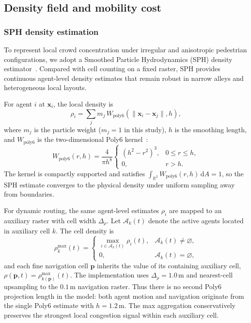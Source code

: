 \documentclass[preprint,12pt]{elsarticle}
\providecommand{\FloatBarrier}{}
\let\origsubsection\subsection
\renewcommand{\subsection}{\FloatBarrier\origsubsection}
\let\origsubsubsection\subsubsection
\renewcommand{\subsubsection}{\FloatBarrier\origsubsubsection}
\begin{document}
\subsection{Density field and mobility cost}
\label{sec:density}

\subsubsection{SPH density estimation}
\label{sec:density_estimation}

To represent local crowd concentration under irregular and anisotropic
pedestrian configurations, we adopt a Smoothed Particle Hydrodynamics
(SPH) density estimator~\citep{Monaghan1992SPH,muller2003particle}.
Compared with cell counting on a fixed raster, SPH provides continuous
agent-level density estimates that remain robust in narrow alleys and
heterogeneous local layouts.

For agent $i$ at $\mathbf{x}_i$, the local density is
\begin{equation}
\rho_i = \sum_{j} m_j \, W_{\mathrm{poly6}}(\|\mathbf{x}_i-\mathbf{x}_j\|, h),
\label{eq:sph_density_agent}
\end{equation}
where $m_j$ is the particle weight ($m_j = 1$ in this study), $h$ is the
smoothing length, and $W_{\mathrm{poly6}}$ is the two-dimensional Poly6
kernel~\citep{muller2003particle}:
\begin{equation}
W_{\mathrm{poly6}}(r, h) = \frac{4}{\pi h^8}
\begin{cases}
(h^2-r^2)^3, & 0 \le r \le h,\\
0, & r > h.
\end{cases}
\label{eq:poly6_kernel}
\end{equation}
The kernel is compactly supported and satisfies
$\int_{\mathbb{R}^2} W_{\mathrm{poly6}}(r, h)\,\mathrm{d}A = 1$, so the
SPH estimate converges to the physical density under uniform sampling
away from boundaries.

For dynamic routing, the same agent-level estimates $\rho_i$ are mapped
to an auxiliary raster with cell width $\Delta_\rho$. Let
$\mathcal{A}_k(t)$ denote the active agents located in auxiliary cell
$k$. The cell density is
\begin{equation}
\rho_k^{\max}(t)=
\begin{cases}
\displaystyle\max_{i\in\mathcal{A}_k(t)}\rho_i(t),
& \mathcal{A}_k(t)\ne\varnothing,\\[4pt]
0, & \mathcal{A}_k(t)=\varnothing,
\end{cases}
\label{eq:sph_density_grid}
\end{equation}
and each fine navigation cell $\mathbf{p}$ inherits the value of its
containing auxiliary cell,
$\rho(\mathbf{p},t)=\rho_{k(\mathbf{p})}^{\max}(t)$. The implementation
uses $\Delta_\rho=1.0$\,m and nearest-cell upsampling to the $0.1$\,m
navigation raster. Thus there is no second Poly6 projection length
in the model: both agent motion and navigation originate from the single
Poly6 estimate with $h=1.2$\,m. The max aggregation conservatively
preserves the strongest local congestion signal within each auxiliary
cell.
\end{document}
